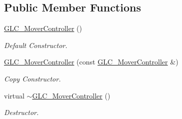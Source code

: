 \subsection*{Public Member Functions}
\begin{DoxyCompactItemize}
\item 
\hyperlink{class_g_l_c___mover_controller_adb38a115c1ce9e5e0534313d92c497d9}{G\-L\-C\-\_\-\-Mover\-Controller} ()
\begin{DoxyCompactList}\small\item\em Default Constructor. \end{DoxyCompactList}\item 
\hyperlink{class_g_l_c___mover_controller_abd0d7163cf0f5ce7f85b2f7bd74139b1}{G\-L\-C\-\_\-\-Mover\-Controller} (const \hyperlink{class_g_l_c___mover_controller}{G\-L\-C\-\_\-\-Mover\-Controller} \&)
\begin{DoxyCompactList}\small\item\em Copy Constructor. \end{DoxyCompactList}\item 
virtual \hyperlink{class_g_l_c___mover_controller_aa99ba114551e90c7f03027d50831f49d}{$\sim$\-G\-L\-C\-\_\-\-Mover\-Controller} ()
\begin{DoxyCompactList}\small\item\em Destructor. \end{DoxyCompactList}\end{DoxyCompactItemize}
